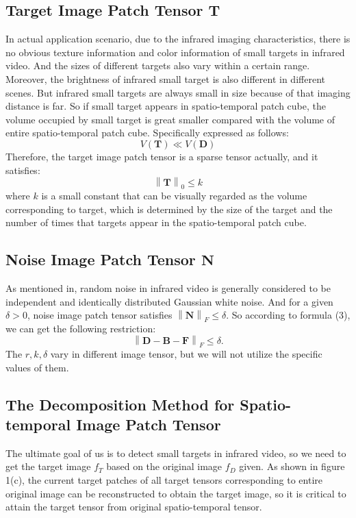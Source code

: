 \documentclass[journal]{IEEEtran}
\begin{document}
\subsection{Target Image Patch Tensor $\mathbf{T}$}
In actual application scenario, due to the infrared imaging characteristics, there is no obvious texture information and color information of small targets in infrared video. And the sizes of different targets also vary within a certain range. Moreover, the brightness of infrared small target is also different in different scenes. But infrared small targets are always small in size because of that imaging distance is far. So if small target appears in spatio-temporal patch cube, the volume occupied by small target is great smaller compared with the volume of entire spatio-temporal patch cube. Specifically expressed as follows:
\begin{equation}
  V(\bm{T}) \ll V(\bm{D})
\end{equation}
Therefore, the target image patch tensor is a sparse tensor actually, and it satisfies:
\begin{equation}
  \left \| \bm{T} \right \|_0 \leq k
\end{equation}
where $k$ is a small constant that can be visually regarded as the volume corresponding to target, which is determined by the size of the target and the number of times that targets appear in the spatio-temporal patch cube.

\subsection{Noise Image Patch Tensor $\mathbf{N}$}
As mentioned in\cite{gao2013infrared}, random noise in infrared video is generally considered to be independent and identically distributed Gaussian white noise. And for a given $\delta>0$, noise image patch tensor satisfies $\left \| \bm{N} \right \|_F \leq \delta$. So according to formula (3), we can get the following restriction:
\begin{equation}
  \left \| \bm{D}-\bm{B}-\bm{F} \right \|_F \leq \delta.
\end{equation}
The $r,k,\delta$ vary in different image tensor, but we will not utilize the specific values of them.


\subsection{The Decomposition Method for Spatio-temporal Image Patch Tensor}
The ultimate goal of us is to detect small targets in infrared video, so we need to get the target image $f_T$ based on the original image $f_D$ given. As shown in figure 1(c), the current target patches of all target tensors corresponding to entire original image can be reconstructed to obtain the target image, so it is critical to attain the target tensor from original spatio-temporal tensor.
\end{document}
